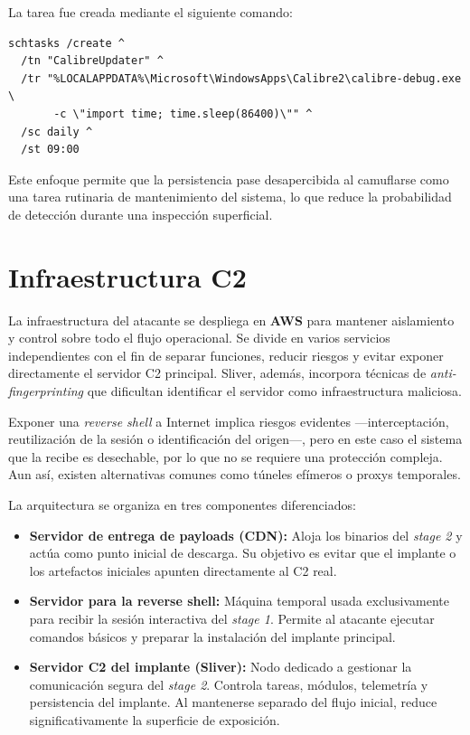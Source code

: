 La tarea fue creada mediante el siguiente comando:

\begin{verbatim}
schtasks /create ^
  /tn "CalibreUpdater" ^
  /tr "%LOCALAPPDATA%\Microsoft\WindowsApps\Calibre2\calibre-debug.exe \
       -c \"import time; time.sleep(86400)\"" ^
  /sc daily ^
  /st 09:00
\end{verbatim}


Este enfoque permite que la persistencia pase desapercibida al camuflarse como una tarea rutinaria de 
mantenimiento del sistema, lo que reduce la probabilidad de detección durante una inspección superficial.

\section{Infraestructura C2}
\label{sec:infraestructura}

La infraestructura del atacante se despliega en \textbf{AWS} para mantener aislamiento y control sobre todo el flujo operacional. Se divide en varios servicios independientes con el fin de separar funciones, reducir riesgos y evitar exponer directamente el servidor C2 principal. Sliver, además, incorpora técnicas de \textit{anti-fingerprinting} que dificultan identificar el servidor como infraestructura maliciosa.

Exponer una \textit{reverse shell} a Internet implica riesgos evidentes —interceptación, reutilización de la sesión o identificación del origen—, pero en este caso el sistema que la recibe es desechable, por lo que no se requiere una protección compleja. Aun así, existen alternativas comunes como túneles efímeros o proxys temporales.

La arquitectura se organiza en tres componentes diferenciados:

\begin{itemize}
    \item \textbf{Servidor de entrega de payloads (CDN):} Aloja los binarios del \textit{stage 2} y actúa como punto inicial de descarga. Su objetivo es evitar que el implante o los artefactos iniciales apunten directamente al C2 real.
    \item \textbf{Servidor para la reverse shell:} Máquina temporal usada exclusivamente para recibir la sesión interactiva del \textit{stage 1}. Permite al atacante ejecutar comandos básicos y preparar la instalación del implante principal.
    \item \textbf{Servidor C2 del implante (Sliver):} Nodo dedicado a gestionar la comunicación segura del \textit{stage 2}. Controla tareas, módulos, telemetría y persistencia del implante. Al mantenerse separado del flujo inicial, reduce significativamente la superficie de exposición.
\end{itemize}


